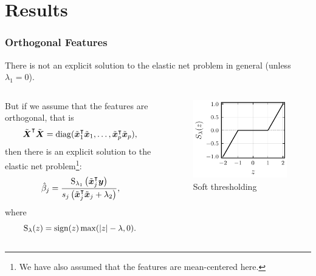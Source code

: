 \documentclass[10pt]{beamer}
\begin{document}
\section{Results}

\begin{frame}[c]
  \frametitle{Orthogonal Features}

  There is not an explicit solution to the elastic net problem in general (unless \(\lambda_1 = 0\)).

  \bigskip\pause

  \begin{columns}
    \begin{column}{0.45\textwidth}
      But if we assume that the features are orthogonal, that is
      \[
        \tilde{\boldsymbol{X}}^\intercal \tilde{\boldsymbol{X}} = \operatorname{diag}(\tilde{\boldsymbol{x}}_1^\intercal \tilde{\boldsymbol{x}}_1, \dots, \tilde{\boldsymbol{x}}_p^\intercal \tilde{\boldsymbol{x}}_p),
      \]
      then there is an explicit solution to the elastic net problem\footnote[frame]{We have also assumed that the features are mean-centered here.}:
      \begin{equation*}
        \hat\beta_j = \frac{\operatorname{S}_{\lambda_1}\left(\tilde{\boldsymbol{x}}_j^\intercal \boldsymbol{y}\right)}{s_j\left(\tilde{\boldsymbol{x}}_j^\intercal \tilde{\boldsymbol{x}}_j + \lambda_2\right)},
      \end{equation*}
      where
      \[
        \operatorname{S}_\lambda(z) = \operatorname{sign}(z) \max(|z| - \lambda, 0).
      \]\pause
    \end{column}
    \begin{column}{0.45\textwidth}
      \begin{figure}[htpb]
        \centering
        \includegraphics[]{figures/soft-thresholding.pdf}
        \caption{%
          Soft thresholding
        }
      \end{figure}
    \end{column}
  \end{columns}

\end{frame}
\end{document}
